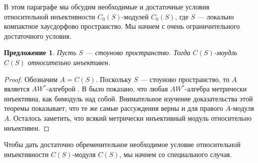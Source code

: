 \documentclass[12pt]{article}
\newtheorem{proposition}[theorem]{Предложение}
\begin{document}
В этом параграфе мы обсудим необходимые и достаточные условия относительной инъективности $C_0(S)$-модулей $C_0(S)$, где $S$ --- локально компактное хаусдорфово пространство. Мы начнем с очень ограничительного достаточного условия.

\begin{proposition}\label{SStonImplRelInjCSModCS} Пусть $S$ --- стоуново пространство. Тогда $C(S)$-моудль $C(S)$ относительно инъективен.
\end{proposition}
\begin{proof} Обозначим $A=C(S)$. Поскольку $S$ --- стоуново пространство, то $A$ является $AW^*$-алгеброй \cite[глава 1, параграф 7]{BerbBaerStRng}. В \cite[теорема 2]{TakHanBanThAndJordDecomOfModMap} было показано, что любая $AW^*$-алгебра метрически инъективна, как бимодуль над собой. Внимательное изучение доказательства этой теоремы показывает, что те же самые рассуждения верны и для правого $A$-модуля $A$. Осталось заметить, что всякий метрически инъективный модуль относительно инъективен.
\end{proof}

Чтобы дать достаточно обременительное необходимое условие относительной инъективности $C(S)$-модуля $C(S)$, мы начнем со специального случая.
\end{document}
